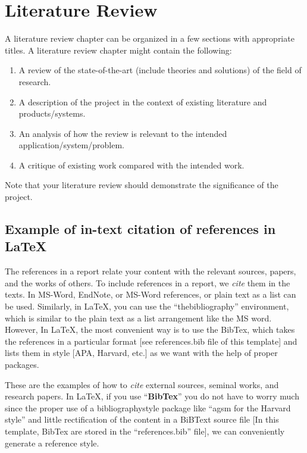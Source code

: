 \chapter{Literature Review}
\label{ch:lit_rev} %

A literature review chapter can be organized in a few sections with appropriate titles. A literature review chapter might  contain the following:
\begin{enumerate}
    \item A review of the state-of-the-art (include theories and solutions) of the field of research.
    \item A description of the project in the context of existing literature and products/systems.
    \item An analysis of how the review is relevant to the intended application/system/problem.
    \item A critique of existing work compared with the intended work.
\end{enumerate}
Note that your literature review should demonstrate the significance of the project.

\section{Example of in-text citation of references in \LaTeX} 
The references in a report relate your content with the relevant sources, papers, and the works of others. To include references in a report, we \textit{cite} them in the texts. In MS-Word, EndNote, or MS-Word references, or plain text as a list can be used. Similarly, in \LaTeX, you can use the ``thebibliography'' environment, which is similar to the plain text as a list arrangement like the MS word. However, In \LaTeX, the most convenient way is to use the BibTex, which takes the references in a particular format [see references.bib file of this template] and lists them in style [APA, Harvard, etc.] as we want with the help of proper packages.    

These are the examples of how to \textit{cite} external sources, seminal works, and research papers. In \LaTeX, if you use ``\textbf{BibTex}'' you do not have to worry much since the proper use of a bibliographystyle package like ``agsm for the Harvard style'' and little rectification of the content in a BiBText source file [In this template, BibTex are stored in the ``references.bib'' file], we can conveniently generate  a reference style. 


